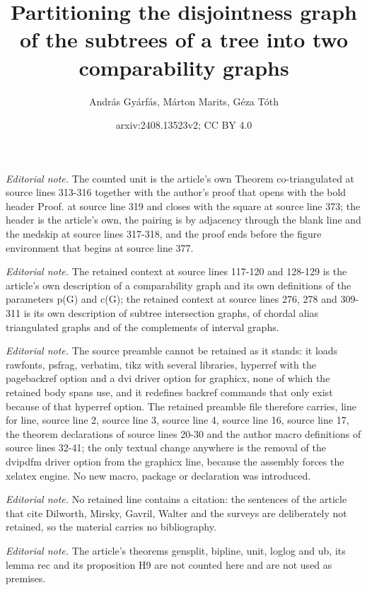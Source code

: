 \documentclass[12pt]{article}
\title{Partitioning the disjointness graph of the subtrees of a tree into two comparability graphs}
\author{András Gyárfás, Márton Marits, Géza Tóth}
\date{arxiv:2408.13523v2; CC BY 4.0}
\begin{document}
\maketitle
\noindent\textit{Editorial note.} The counted unit is the article's own Theorem co-triangulated at source lines 313-316 together with the author's proof that opens with the bold header Proof. at source line 319 and closes with the square at source line 373; the header is the article's own, the pairing is by adjacency through the blank line and the medskip at source lines 317-318, and the proof ends before the figure environment that begins at source line 377.\par\medskip
\noindent\textit{Editorial note.} The retained context at source lines 117-120 and 128-129 is the article's own description of a comparability graph and its own definitions of the parameters p(G) and c(G); the retained context at source lines 276, 278 and 309-311 is its own description of subtree intersection graphs, of chordal alias triangulated graphs and of the complements of interval graphs.\par\medskip
\noindent\textit{Editorial note.} The source preamble cannot be retained as it stands: it loads rawfonts, psfrag, verbatim, tikz with several libraries, hyperref with the pagebackref option and a dvi driver option for graphicx, none of which the retained body spans use, and it redefines backref commands that only exist because of that hyperref option. The retained preamble file therefore carries, line for line, source line 2, source line 3, source line 4, source line 16, source line 17, the theorem declarations of source lines 20-30 and the author macro definitions of source lines 32-41; the only textual change anywhere is the removal of the dvipdfm driver option from the graphicx line, because the assembly forces the xelatex engine. No new macro, package or declaration was introduced.\par\medskip
\noindent\textit{Editorial note.} No retained line contains a citation: the sentences of the article that cite Dilworth, Mirsky, Gavril, Walter and the surveys are deliberately not retained, so the material carries no bibliography.\par\medskip
\noindent\textit{Editorial note.} The article's theorems gensplit, bipline, unit, loglog and ub, its lemma rec and its proposition H9 are not counted here and are not used as premises.\par\medskip
\end{document}
